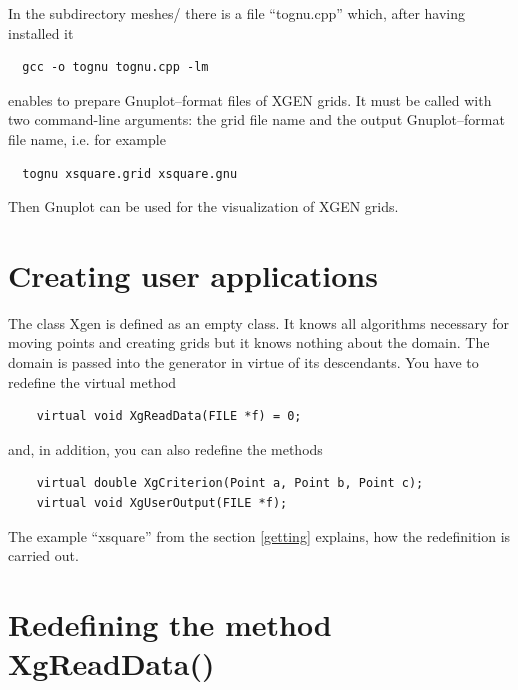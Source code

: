 \documentclass[12pt]{article}
\begin{document}
  In the subdirectory meshes/ there is a file ``tognu.cpp'' which,
  after having installed it
  \begin{verbatim}
  gcc -o tognu tognu.cpp -lm
  \end{verbatim}
  enables to prepare Gnuplot--format files of XGEN grids. It must be called with
  two command-line arguments: the grid file name and the output Gnuplot--format file
  name, i.e. for example
  \begin{verbatim}
  tognu xsquare.grid xsquare.gnu
  \end{verbatim}
  Then Gnuplot can be used for the visualization of XGEN grids.

  \section{Creating user applications} \label{vl_apl}

  The class Xgen is defined as an empty class. It knows all algorithms
  necessary for moving points and creating grids but it knows nothing
  about the domain. The domain is passed into the generator in virtue of
  its descendants. You have to redefine the virtual method

  \begin{verbatim}
    virtual void XgReadData(FILE *f) = 0;
  \end{verbatim}

  \noindent
  and, in addition, you can also redefine the methods
  \begin{verbatim}
    virtual double XgCriterion(Point a, Point b, Point c);
    virtual void XgUserOutput(FILE *f);
  \end{verbatim}
  The example ``xsquare'' from the section \ref{getting} explains, how the redefinition is carried out.

  \section{Redefining the method XgReadData()}
\end{document}
